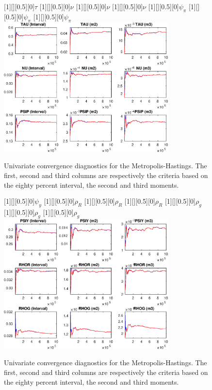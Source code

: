 \begin{figure}[H]
[1][][0.5][0]{$ {\tau} $}
[1][][0.5][0]{$ {\nu} $}
[1][][0.5][0]{$ {\nu} $}
[1][][0.5][0]{$ {\nu} $}
[1][][0.5][0]{$ {\psi_\pi} $}
[1][][0.5][0]{$ {\psi_\pi} $}
[1][][0.5][0]{$ {\psi_\pi} $}
\centering 
\includegraphics[width=0.80\textwidth]{AnSchoModTheBuilder/Output/AnSchoModTheBuilder_udiag2}
\caption{Univariate convergence diagnostics for the Metropolis-Hastings.
The first, second and third columns are respectively the criteria based on
the eighty percent interval, the second and third moments.}\label{Fig:UnivariateDiagnostics:2}
\end{figure}

\begin{figure}[H]
[1][][0.5][0]{$ {\psi_y} $}
[1][][0.5][0]{$ {\rho_R} $}
[1][][0.5][0]{$ {\rho_R} $}
[1][][0.5][0]{$ {\rho_R} $}
[1][][0.5][0]{$ {\rho_{g}} $}
[1][][0.5][0]{$ {\rho_{g}} $}
[1][][0.5][0]{$ {\rho_{g}} $}
\centering 
\includegraphics[width=0.80\textwidth]{AnSchoModTheBuilder/Output/AnSchoModTheBuilder_udiag3}
\caption{Univariate convergence diagnostics for the Metropolis-Hastings.
The first, second and third columns are respectively the criteria based on
the eighty percent interval, the second and third moments.}\label{Fig:UnivariateDiagnostics:3}
\end{figure}

